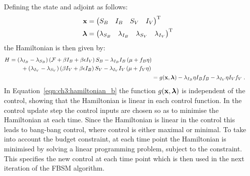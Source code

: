 Defining the state and adjoint as follows:
{\renewcommand{\arraystretch}{1}
\begin{subequations}\label{eqn:ch3:state_adjoint}
    \begin{align}
        \mathbf{\bm{x}} &= \begin{pmatrix}S_B & I_B & S_V & I_V\end{pmatrix}^\mathrm{T} \label{eqn:ch3:state_adjoint_a}\\
        \mathbf{\bm{\lambda}} &= \begin{pmatrix}
            \lambda_{S_B} & \lambda_{I_B} & \lambda_{S_V} & \lambda_{I_V}
        \end{pmatrix}^\mathrm{T} \label{eqn:ch3:state_adjoint_b}
    \end{align}
\end{subequations}
}
the Hamiltonian is then given by:
\begin{subequations}\label{eqn:ch3:hamiltonian}
    \begin{align}
    \begin{split}
    H &= (\lambda_{I_B} - \lambda_{S_B})\left(\mathcal{F}+\beta{}I_B+\beta\epsilon{}I_V\right)S_B - \lambda_{I_B}I_B\left(\mu+f_B\eta\right) \\
    &{}\quad\quad+(\lambda_{I_V} - \lambda_{S_V})\left(\beta{}I_V+\beta\epsilon{}I_B\right)S_V - \lambda_{I_V}I_V\left(\mu+f_V\eta\right)\label{eqn:ch3:hamiltonian_a}
    \end{split}\\
    &= g(\mathbf{\bm{x}}, \mathbf{\bm{\lambda}}) - \lambda_{I_B}\eta{}I_Bf_B - \lambda_{I_V}\eta{}I_Vf_V\;.\label{eqn:ch3:hamiltonian_b}
    \end{align}
\end{subequations}
In Equation~\ref{eqn:ch3:hamiltonian_b} the function $g(\mathbf{\bm{x}}, \mathbf{\bm{\lambda}})$ is independent of the control, showing that the Hamiltonian is linear in each control function. In the control update step the control inputs are chosen so as to minimise the Hamiltonian at each time. Since the Hamiltonian is linear in the control this leads to bang-bang control, where control is either maximal or minimal. To take into account the budget constraint, at each time point the Hamiltonian is minimised by solving a linear programming problem, subject to the constraint. This specifies the new control at each time point which is then used in the next iteration of the FBSM algorithm.

